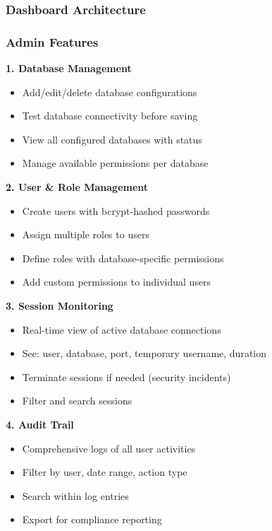 \subsubsection{Dashboard Architecture}

\subsubsection{Admin Features}

\textbf{1. Database Management}
\begin{itemize}
    \item Add/edit/delete database configurations
    \item Test database connectivity before saving
    \item View all configured databases with status
    \item Manage available permissions per database
\end{itemize}

\textbf{2. User \& Role Management}
\begin{itemize}
    \item Create users with bcrypt-hashed passwords
    \item Assign multiple roles to users
    \item Define roles with database-specific permissions
    \item Add custom permissions to individual users
\end{itemize}

\textbf{3. Session Monitoring}
\begin{itemize}
    \item Real-time view of active database connections
    \item See: user, database, port, temporary username, duration
    \item Terminate sessions if needed (security incidents)
    \item Filter and search sessions
\end{itemize}

\textbf{4. Audit Trail}
\begin{itemize}
    \item Comprehensive logs of all user activities
    \item Filter by user, date range, action type
    \item Search within log entries
    \item Export for compliance reporting
\end{itemize}


